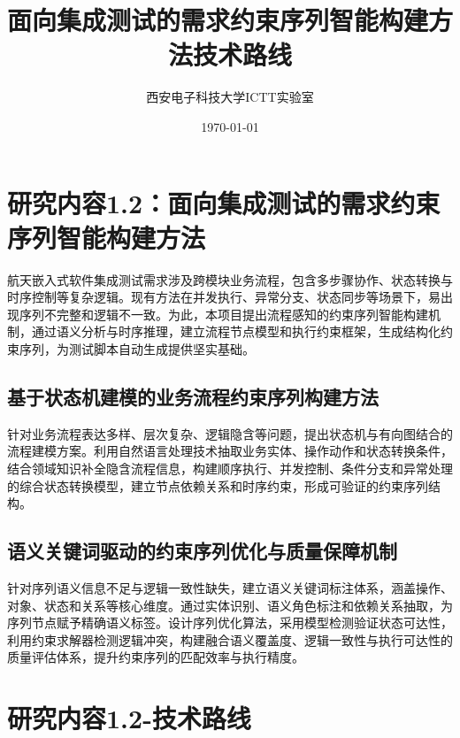 \documentclass[fontset=windows]{article}
\title{\heiti\zihao{2} 面向集成测试的需求约束序列智能构建方法技术路线}
\author{\songti 西安电子科技大学ICTT实验室}
\date{\today}
\begin{document}
\pagestyle{main}

\tableofcontents
\clearpage


\section{研究内容1.2：面向集成测试的需求约束序列智能构建方法}

航天嵌入式软件集成测试需求涉及跨模块业务流程，包含多步骤协作、状态转换与时序控制等复杂逻辑。现有方法在并发执行、异常分支、状态同步等场景下，易出现序列不完整和逻辑不一致。为此，本项目提出流程感知的约束序列智能构建机制，通过语义分析与时序推理，建立流程节点模型和执行约束框架，生成结构化约束序列，为测试脚本自动生成提供坚实基础。

\subsection{基于状态机建模的业务流程约束序列构建方法}

针对业务流程表达多样、层次复杂、逻辑隐含等问题，提出状态机与有向图结合的流程建模方案。利用自然语言处理技术抽取业务实体、操作动作和状态转换条件，结合领域知识补全隐含流程信息，构建顺序执行、并发控制、条件分支和异常处理的综合状态转换模型，建立节点依赖关系和时序约束，形成可验证的约束序列结构。

\subsection{语义关键词驱动的约束序列优化与质量保障机制}

针对序列语义信息不足与逻辑一致性缺失，建立语义关键词标注体系，涵盖操作、对象、状态和关系等核心维度。通过实体识别、语义角色标注和依赖关系抽取，为序列节点赋予精确语义标签。设计序列优化算法，采用模型检测验证状态可达性，利用约束求解器检测逻辑冲突，构建融合语义覆盖度、逻辑一致性与执行可达性的质量评估体系，提升约束序列的匹配效率与执行精度。

\section{研究内容1.2-技术路线}
\end{document}
